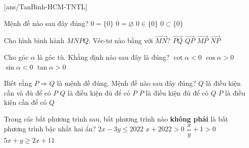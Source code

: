 

[ans/TanBinh-HCM-TNTL]
\begin{ex}%
Mệnh đề nào sau đây đúng?
\choice
{$0=\{0\}$}
{$0=\varnothing$}
{\True $0 \in\{0\}$}
{$0 \subset\{0\}$}
\end{ex}
\begin{ex}%
Cho hình bình hành $MNPQ$. Véc-tơ nào bằng với $\vec{MN}$?
\choice
{$\vec{PQ}$}
{\True $\overrightarrow{QP}$}
{$\overrightarrow{MP}$}
{$\vec{NP}$}
\end{ex}
\begin{ex}%
Cho góc $\alpha$ là góc tù. Khẳng định nào sau đây là đúng?
\choice
{\True $\cot \alpha<0$}
{$\cos \alpha>0$}
{$\sin \alpha<0$}
{$\tan \alpha>0$}
\end{ex}
\begin{ex}%
Biết rằng $P\Rightarrow Q$ là mệnh đề đúng. Mệnh đề nào sau đây đúng?
\choice
{$Q$ là điều kiện cần và đủ để có $P$}
{$Q$ là điều kiện đủ để có $P$}
{\True $P$ là điều kiện đủ để có $Q$}
{$P$ là điều kiện cần để có $Q$}
\end{ex}
\begin{ex}%
Trong các bất phương trình sau, bất phương trình nào \textbf{không phải} là bất phương trình bậc nhất hai ẩn?
\choice
{$2 x-3 y \leq 2022$}
{$x+2022>0$}
{\True $\dfrac{x}{y}+1>0$}
{$5 x+y \geq 2 x+11$}
\end{ex}
